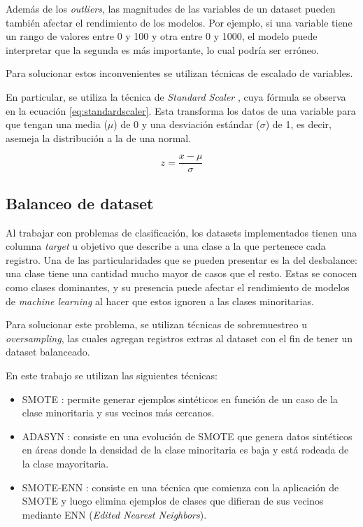 Además de los \textit{outliers}, las magnitudes de las variables de un dataset pueden también afectar el rendimiento de los modelos. Por ejemplo, si una variable tiene un rango de valores entre 0 y 100 y otra entre 0 y 1000, el modelo puede interpretar que la segunda es más importante, lo cual podría ser erróneo.

Para solucionar estos inconvenientes se utilizan técnicas de escalado de variables.

En particular, se utiliza la técnica de \textit{Standard Scaler} \citep{WEBSITE:standardscaler}, cuya fórmula se observa en la ecuación \ref{eq:standardscaler}. Esta transforma los datos de una variable para que tengan una media ($\mu$) de 0 y una desviación estándar ($\sigma$) de 1, es decir, asemeja la distribución a la de una normal.

\begin{equation}
	\label{eq:standardscaler}
	z = \frac{x-\mu}{\sigma}
\end{equation}

\subsection{Balanceo de dataset}
\label{subsec:tecnicas_balanceo}

Al trabajar con problemas de clasificación, los datasets implementados tienen una columna \textit{target} u objetivo que describe a una clase a la que pertenece cada registro. Una de las particularidades que se pueden presentar es la del desbalance: una clase tiene una cantidad mucho mayor de casos que el resto. Estas se conocen como clases dominantes, y su presencia puede afectar el rendimiento de modelos de \textit{machine learning} al hacer que estos ignoren a las clases minoritarias.

Para solucionar este problema, se utilizan técnicas de sobremuestreo u \textit{oversampling}, las cuales agregan registros extras al dataset con el fin de tener un dataset balanceado.

En este trabajo se utilizan las siguientes técnicas:
\begin{itemize}
    \item SMOTE \citep{article:smote}: permite generar ejemplos sintéticos en función de un caso de la clase minoritaria y sus vecinos más cercanos.
    \item ADASYN \citep{article:adasyn}: consiste en una evolución de SMOTE que genera datos sintéticos en áreas donde la densidad de la clase minoritaria es baja y está rodeada de la clase mayoritaria.
    \item SMOTE-ENN \citep{article:smoteenn}: consiste en una técnica que comienza con la aplicación de SMOTE y luego elimina ejemplos de clases que difieran de sus vecinos mediante ENN (\textit{Edited Nearest Neighbors}).
\end{itemize}

